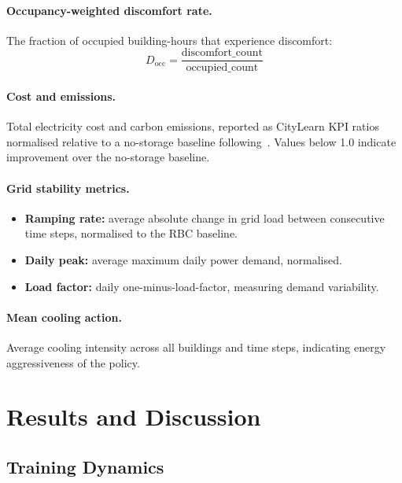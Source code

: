 \paragraph{Occupancy-weighted discomfort rate.}
The fraction of occupied building-hours that experience discomfort:
\begin{equation}
  D_{\text{occ}} = \frac{\text{discomfort\_count}}{\text{occupied\_count}}
  \label{eq:discomfort-occ-rate}
\end{equation}

\paragraph{Cost and emissions.}
Total electricity cost and carbon emissions, reported as CityLearn KPI ratios
normalised relative to a no-storage baseline following~\cite{zhang2025stems}.
Values below 1.0 indicate improvement over the no-storage baseline.

\paragraph{Grid stability metrics.}
\begin{itemize}
  \item \textbf{Ramping rate:} average absolute change in grid load between
        consecutive time steps, normalised to the RBC baseline.
  \item \textbf{Daily peak:} average maximum daily power demand, normalised.
  \item \textbf{Load factor:} daily one-minus-load-factor, measuring demand
        variability.
\end{itemize}

\paragraph{Mean cooling action.}
Average cooling intensity across all buildings and time steps, indicating
energy aggressiveness of the policy.


\section{Results and Discussion}
\label{sec:temp-results}

\subsection{Training Dynamics}
\label{sec:temp-results-training}

